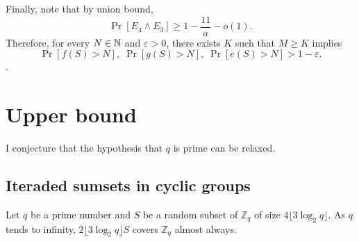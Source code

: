 Finally, note that by union bound, 
\[\Pr[E_4 \land E_3] \geq 1 - \frac{11}{a} - o(1).\] 
Therefore, for every $N \in \mathbb{N}$ and $\varepsilon > 0$, there exists $K$ such that $M \geq K$ implies \[\Pr[f(S) > N], \; \Pr[g(S) > N], \; \Pr[e(S) > N] > 1 - \varepsilon.\].


\section{Upper bound}\label{sec:results:upperbound}

I conjecture that the hypothesis that $q$ is prime can be relaxed.
\subsection{Iteraded sumsets in cyclic groups}
\begin{lemma}\label{lem:sumset}
    Let $q$ be a prime number and $S$ be a random subset of $\mathbb{Z}_q$ of size $4\lfloor3\log_2 q\rfloor$. As $q$ tends to infinity, $2\lfloor3\log_2 q\rfloor S$ covers $\mathbb{Z}_q$ almost always. 
\end{lemma}

